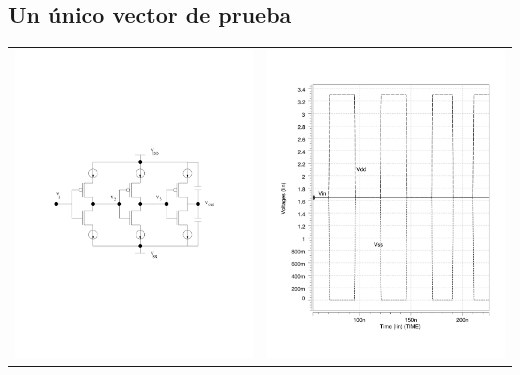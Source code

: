 \documentclass[
paper=128mm:96mm, %
fontsize=11pt, %
pagesize, %
parskip=half-, %
]{scrartcl} %
\theoremstyle{mythmstyle} %
\begin{document}
\clearpage






\subsection{Un único vector de prueba}

{\centering
\begin{tabular}{cc}
\includegraphics[width=0.4\linewidth]{buffer01}&\includegraphics[width=0.4\linewidth]{iddqprt}\\
\end{tabular}}
\end{document}
